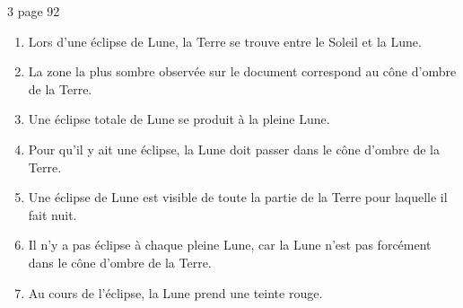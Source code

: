 \begin{myact}{3 page 92}
	\begin{enumerate}
		\item Lors d'une éclipse de Lune, la Terre se trouve entre le Soleil et la Lune.\pause
		\item La zone la plus sombre observée sur le document correspond au cône d'ombre de la Terre.\pause
		\item Une éclipse totale de Lune se produit à la pleine Lune.\pause
		\item Pour qu'il y ait une éclipse, la Lune doit passer dans le cône d'ombre de la Terre.\pause
		\item Une éclipse de Lune est visible de toute la partie de la Terre pour laquelle il fait nuit.\pause
		\item Il n'y a pas éclipse à chaque pleine Lune, car la Lune n'est pas forcément dans le cône d'ombre de la Terre.\pause
		\item Au cours de l'éclipse, la Lune prend une teinte rouge.		
	\end{enumerate}
\end{myact}